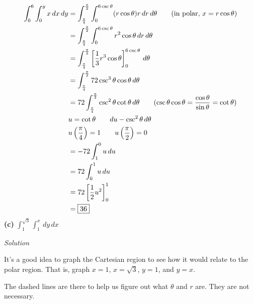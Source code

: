 \documentclass{article}
\newcommand{\lrp}[1]{\left( #1 \right)}
\newcommand{\lrb}[1]{\left[ #1 \right]}
\newcommand{\Solution}{\textit{Solution}}
\begin{document}
\begin{align*}
    \int_0^6\int_0^yx\,dx\,dy&=\int_{\frac{\pi}{4}}^{\frac{\pi}{2}}\int_0^{6\csc\theta}( r\cos \theta)r\,dr\,d\theta\tag{in polar, $x=r\cos\theta$}\\
    &=\int_{\frac{\pi}{4}}^{\frac{\pi}{2}}\int_0^{6\csc\theta} r^2\cos\theta
    \,dr\,d\theta\\
    &=\int_{\frac{\pi}{4}}^{\frac{\pi}{2}}\lrb{\frac{1}{3}r^3\cos\theta}_0^{6\csc\theta}\,d\theta\\
    &=\int_{\frac{\pi}{4}}^{\frac{\pi}{2}} 72 \csc^3\theta \cos\theta \,d\theta\\
    &=72\int_{\frac{\pi}{4}}^{\frac{\pi}{2}} \csc^2\theta\cot\theta\,d\theta\tag{$\displaystyle\csc\theta\cos\theta=\frac{\cos\theta}{\sin\theta}=\cot\theta$}\\
    &u=\cot\theta \hspace{2em}du-\csc^2\theta\,d\theta\\
    &u\lrp{\frac{\pi}{4}}=1\hspace{2em}u\lrp{\frac{\pi}{2}}=0\\
    &=-72\int_1^{0}u\,du\\
    &=72\int_0^1u\,du\\
    &=72\lrb{\frac{1}{2}u^2}_0^1\\
    &=\boxed{36}
\end{align*}
\textbf{(c)} $\displaystyle \int_1^{\sqrt{3}}\int_1^x\,dy\,dx$

\Solution

It's a good idea to graph the Cartesian region to see how it would relate to the polar region. That is, graph $x=1$, $x=\sqrt{3}$, $y=1$, and $y=x$. 
\begin{center}
\end{center}
The dashed lines are there to help us figure out what $\theta$ and $r$ are. They are not necessary.
\end{document}
